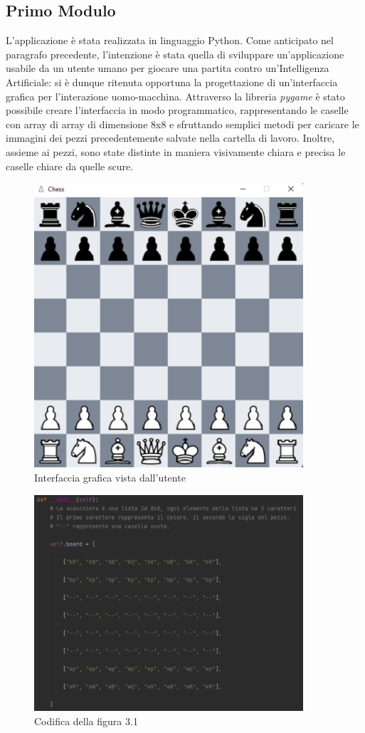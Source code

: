 \subsection{Primo Modulo}
L'applicazione è stata realizzata in linguaggio Python. Come anticipato nel paragrafo precedente, l'intenzione è stata quella di sviluppare un'applicazione usabile da un utente umano per giocare una partita contro un'Intelligenza Artificiale: si è dunque ritenuta opportuna la progettazione di un'interfaccia grafica per l'interazione uomo-macchina. Attraverso la libreria \textit{pygame} è stato possibile creare l'interfaccia in modo programmatico, rappresentando le caselle con array di array di dimensione 8x8 e sfruttando semplici metodi per caricare le immagini dei pezzi precedentemente salvate nella cartella di lavoro. Inoltre, assieme ai pezzi, sono state distinte in maniera visivamente chiara e precisa le caselle chiare da quelle scure. 
\begin{figure}[!htb]
    \includegraphics[width=10cm]{frontmatter/figure/scacchiera_gui.pdf}
    \centering
    \caption{Interfaccia grafica vista dall'utente}
    \label{fig:scacchiera_gui}
\end{figure}
\begin{figure}[!htb]
    \includegraphics[width=10cm]{frontmatter/figure/rappresentazione_scacchiera.pdf}
    \centering
    \caption{Codifica della figura 3.1}
    \label{fig:rappresentazione_scacchiera}
\end{figure}
